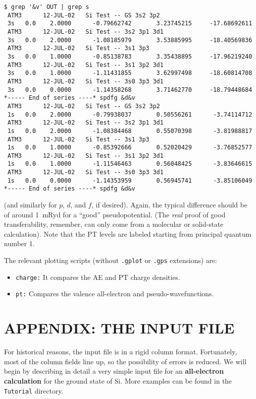 \documentclass[11pt]{article}
\begin{document}
\begin{verbatim}
$ grep '&v' OUT | grep s
 ATM3      12-JUL-02   Si Test -- GS 3s2 3p2
 3s   0.0    2.0000      -0.79662742       3.23745215     -17.68692611
 ATM3      12-JUL-02   Si Test -- 3s2 3p1 3d1
 3s   0.0    2.0000      -1.08185979       3.53885995     -18.40569836
 ATM3      12-JUL-02   Si Test -- 3s1 3p3
 3s   0.0    1.0000      -0.85138783       3.35438895     -17.96219240
 ATM3      12-JUL-02   Si Test -- 3s1 3p2 3d1
 3s   0.0    1.0000      -1.11431855       3.62997498     -18.60814708
 ATM3      12-JUL-02   Si Test -- 3s0 3p3 3d1
 3s   0.0    0.0000      -1.14358268       3.71462770     -18.79448684
*----- End of series ----* spdfg &d&v
 ATM3      12-JUL-02   Si Test -- GS 3s2 3p2
 1s   0.0    2.0000      -0.79938037       0.50556261      -3.74114712
 ATM3      12-JUL-02   Si Test -- 3s2 3p1 3d1
 1s   0.0    2.0000      -1.08384468       0.55070398      -3.81988817
 ATM3      12-JUL-02   Si Test -- 3s1 3p3
 1s   0.0    1.0000      -0.85392666       0.52020429      -3.76852577
 ATM3      12-JUL-02   Si Test -- 3s1 3p2 3d1
 1s   0.0    1.0000      -1.11546463       0.56048425      -3.83646615
 ATM3      12-JUL-02   Si Test -- 3s0 3p3 3d1
 1s   0.0    0.0000      -1.14353959       0.56945741      -3.85106049
*----- End of series ----* spdfg &d&v
\end{verbatim}

(and similarly for $p$, $d$, and $f$, if desired). Again, the typical
difference should be of around 1~mRyd for a ``good'' pseudopotential.
(The {\sl real\/} proof of good transferability, remember, can only come
from a molecular or solid-state calculation). Note that the PT levels
are labeled starting from principal quantum number 1. 

The relevant plotting scripts (without {\tt .gplot} or {\tt .gps}
extensions) are:

\begin{itemize}
\item {\tt charge:} It compares the AE and PT charge densities.
\item {\tt pt:} Compares the valence all-electron and pseudo-wavefunctions.
\end{itemize}



\section{APPENDIX: THE INPUT FILE}
\label{sec:inputfile}

For historical reasons, the input file is in a rigid column
format. Fortunately, most of the column fields line up, so the
possibility of errors is reduced.  We will begin by describing in
detail a very simple input file for an {\bf all-electron calculation} for
the ground state of Si. More examples can be found in the {\tt
Tutorial} directory.
\end{document}
